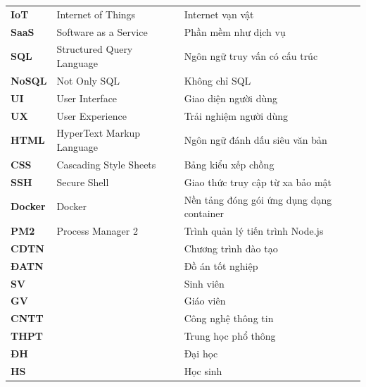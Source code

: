 \documentclass[../DoAn.tex]{subfiles}
\begin{document}
\begin{longtable}{l p{6cm} p{7cm}}
   \textbf{IoT} & Internet of Things & Internet vạn vật\\
   \textbf{SaaS} & Software as a Service & Phần mềm như dịch vụ\\
   \textbf{SQL} & Structured Query Language & Ngôn ngữ truy vấn có cấu trúc\\
   \textbf{NoSQL} & Not Only SQL & Không chỉ SQL\\
   \textbf{UI} & User Interface & Giao diện người dùng\\
   \textbf{UX} & User Experience & Trải nghiệm người dùng\\
   \textbf{HTML} & HyperText Markup Language & Ngôn ngữ đánh dấu siêu văn bản\\
   \textbf{CSS} & Cascading Style Sheets & Bảng kiểu xếp chồng\\
   \textbf{SSH} & Secure Shell & Giao thức truy cập từ xa bảo mật\\
   \textbf{Docker} & Docker & Nền tảng đóng gói ứng dụng dạng container\\
   \textbf{PM2} & Process Manager 2 & Trình quản lý tiến trình Node.js\\
   \textbf{CDTN} &  & Chương trình đào tạo\\
   \textbf{ĐATN} &  & Đồ án tốt nghiệp\\
   \textbf{SV} &  & Sinh viên\\
   \textbf{GV} &  & Giáo viên\\
   \textbf{CNTT} &  & Công nghệ thông tin\\
   \textbf{THPT} &  & Trung học phổ thông\\
   \textbf{ĐH} &  & Đại học\\
   \textbf{HS} &  & Học sinh\\
    \hline
\end{longtable}
\end{document}
